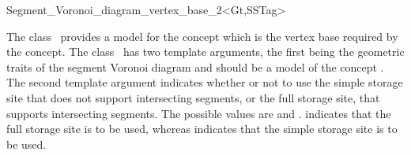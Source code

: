 

\begin{ccRefClass}{Segment_Voronoi_diagram_vertex_base_2<Gt,SSTag>}


\ccDefinition

The class \ccRefName\ provides a model for the
 concept which is the vertex
base required by the 
concept. The class \ccRefName\ has two template arguments, the first
being the geometric traits of the segment Voronoi diagram and should be a
model of the concept .
The second template argument indicates whether
or not to use the simple storage site that does not support
intersecting segments, or the full storage site, that supports
intersecting segments. The possible values are 
and .  indicates that the
full storage site is to be used, whereas 
indicates that the simple storage site is to be used.



\ccIsModel
{}






\end{ccRefClass}
